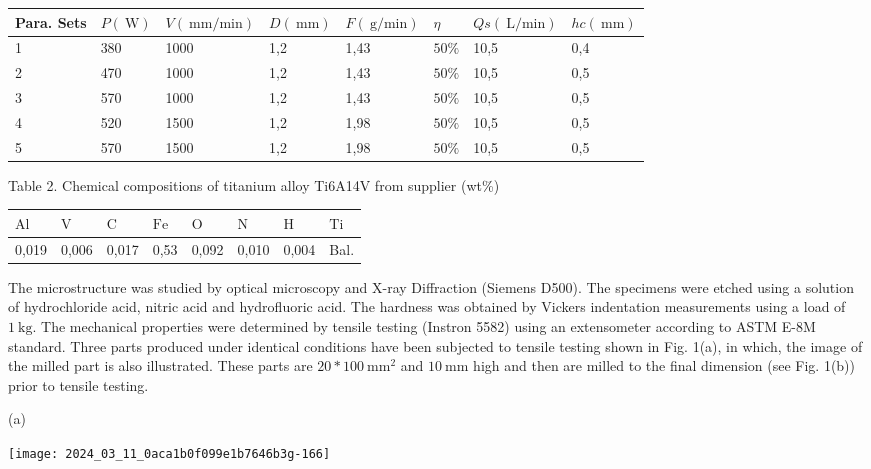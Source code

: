 \documentclass[10pt]{article}
\begin{document}
\begin{center}
\begin{tabular}{llllllll}
\hline
Para. Sets & $P(\mathrm{~W})$ & $V(\mathrm{~mm} / \mathrm{min})$ & $D(\mathrm{~mm})$ & $F(\mathrm{~g} / \mathrm{min})$ & $\eta$ & $Q s(\mathrm{~L} / \mathrm{min})$ & $h c(\mathrm{~mm})$ \\
\hline
1 & 380 & 1000 & 1,2 & 1,43 & $50 \%$ & 10,5 & 0,4 \\
2 & 470 & 1000 & 1,2 & 1,43 & $50 \%$ & 10,5 & 0,5 \\
3 & 570 & 1000 & 1,2 & 1,43 & $50 \%$ & 10,5 & 0,5 \\
4 & 520 & 1500 & 1,2 & 1,98 & $50 \%$ & 10,5 & 0,5 \\
5 & 570 & 1500 & 1,2 & 1,98 & $50 \%$ & 10,5 & 0,5 \\
\hline
\end{tabular}
\end{center}

Table 2. Chemical compositions of titanium alloy Ti6A14V from supplier (wt\%)

\begin{center}
\begin{tabular}{llllllll}
\hline
$\mathrm{Al}$ & $\mathrm{V}$ & $\mathrm{C}$ & $\mathrm{Fe}$ & $\mathrm{O}$ & $\mathrm{N}$ & $\mathrm{H}$ & $\mathrm{Ti}$ \\
\hline
0,019 & 0,006 & 0,017 & 0,53 & 0,092 & 0,010 & 0,004 & Bal. \\
\hline
\end{tabular}
\end{center}

The microstructure was studied by optical microscopy and X-ray Diffraction (Siemens D500). The specimens were etched using a solution of hydrochloride acid, nitric acid and hydrofluoric acid. The hardness was obtained by Vickers indentation measurements using a load of $1 \mathrm{~kg}$. The mechanical properties were determined by tensile testing (Instron 5582) using an extensometer according to ASTM E-8M standard. Three parts produced under identical conditions have been subjected to tensile testing shown in Fig. 1(a), in which, the image of the milled part is also illustrated. These parts are $20 * 100 \mathrm{~mm}^{2}$ and $10 \mathrm{~mm}$ high and then are milled to the final dimension (see Fig. 1(b)) prior to tensile testing.

(a)

\begin{center}
\texttt{[image: 2024\_03\_11\_0aca1b0f099e1b7646b3g-166]}
\end{center}
\end{document}
